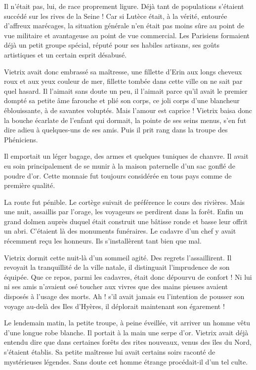 \documentclass[a4paper, 11pt, oneside, polutonikogreek, french]{article}
\begin{document}
Il n'était pas, lui, de race proprement ligure. Déjà tant de populations s'étaient succédé sur les rives de la Seine ! Car si Lutèce était, à la vérité, entourée d'affreux marécages, la situation générale n'en était pas moins sûre au point de vue militaire et avantageuse au point de vue commercial. Les Parisiens formaient déjà un petit groupe spécial, réputé pour ses habiles artisans, ses goûts artistiques et un certain esprit désabusé.

Vietrix avait donc embrassé sa maîtresse, une fillette d'Erin aux longs cheveux roux et aux yeux couleur de mer, fillette tombée dans cette ville on ne sait par quel hasard. Il l'aimait sans doute un peu, il l'aimait parce qu'il avait le premier dompté sa petite âme farouche et plié son corps, ce joli corps d'une blancheur éblouissante, à de savantes voluptés. Mais l'amour est caprice ! Vietrix baisa donc la bouche écarlate de l'enfant qui dormait, la pointe de ses seins menus, s'en fut dire adieu à quelques-uns de ses amis. Puis il prit rang dans la troupe des Phéniciens.

Il emportait un léger bagage, des armes et quelques tuniques de chanvre. Il avait eu soin principalement de se munir à la maison paternelle d'un sac gonflé de poudre d'or. Cette monnaie fut toujours considérée en tous pays comme de première qualité.

\bigskip
\centerline{\EightStarTaper}
\centerline{\EightStarTaper\EightStarTaper}
\bigskip

La route fut pénible. Le cortège suivait de préférence le cours des rivières. Mais une nuit, assaillis par l'orage, les voyageurs se perdirent dans la forêt. Enfin un grand dolmen auprès duquel était construit une bâtisse ronde et basse leur offrit un abri. C'étaient là des monuments funéraires. Le cadavre d'un chef y avait récemment reçu les honneurs. Ils s'installèrent tant bien que mal.

Vietrix dormit cette nuit-là d'un sommeil agité. Des regrets l'assaillirent. Il revoyait la tranquillité de la ville natale, il distinguait l'imprudence de son équipée. Que ce repos, parmi les cadavres, était donc dépourvu de confort ! Ni lui ni ses amis n'avaient osé toucher aux vivres que des mains pieuses avaient disposés à l'usage des morts. Ah ! s'il avait jamais eu l'intention de pousser son voyage au-delà des Iles d'Hyères, il déplorait maintenant son égarement !

Le lendemain matin, la petite troupe, à peine éveillée, vit arriver un homme vêtu d'une longue robe blanche. Il portait à la main une serpe d'or. Vietrix avait déjà entendu dire que dans certaines forêts des rites nouveaux, venus des îles du Nord, s'étaient établis. Sa petite maîtresse lui avait certains soirs raconté de mystérieuses légendes. Sans doute cet homme étrange procédait-il d'un tel culte.
\end{document}
